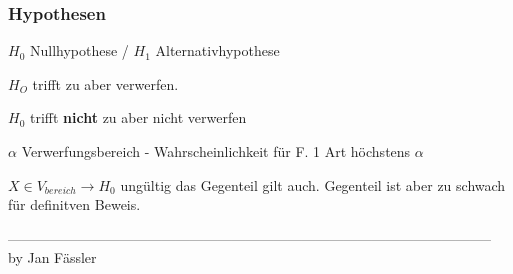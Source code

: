 \documentclass[landscape,twocolumn,a4paper]{article}
\begin{document}
\subsubsection*{Hypothesen}
\begin{description}
 \item $H_0$ Nullhypothese / $H_1$ Alternativhypothese
 \item[Fehler 1 Art:] $H_O$ trifft zu aber verwerfen.
 \item[Fehler 2 Art:] $H_0$ trifft \textbf{nicht} zu aber nicht verwerfen
 \item[Signigikanzniveau] $\alpha$ Verwerfungsbereich - Wahrscheinlichkeit für F. 1 Art höchstens $\alpha$
 \item $ X \in V_{bereich} \rightarrow H_0$ ungültig das Gegenteil gilt auch. Gegenteil ist aber zu schwach für 
definitven Beweis. 
\end{description}
--------------------------------------------------------------------------------------------------------
\\
by Jan Fässler
\end{document}
